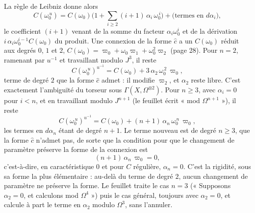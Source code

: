 \documentclass[11pt,a4paper]{article}
\begin{document}
La règle de Leibniz donne alors
\[
  C(\omega_0^{\,u}) = C(\omega_0)\Big( 1 + \sum_{i \geqslant 2}
  (i+1)\,\alpha_i\, \omega_0^{\,i} \Big) + \text{(termes en } d\alpha_i),
\]
le coefficient $(i+1)$ venant de la somme du facteur $\alpha_i\omega_0^i$ et
de la dérivation $i\,\alpha_i\omega_0^{i-1}C(\omega_0)$ du produit. Une
connexion de la forme $\widehat{c}$ a un $C(\omega_0)$ réduit aux degrés
$0$, $1$ et $2$, $C(\omega_0) = \varpi_0 + \omega_0\varpi_1 +
\omega_0^2\varpi_2$ (page 28). Pour $n = 2$, ramenant par $u^{-1}$ et
travaillant modulo $J^3$, il reste
\[
  C(\omega_0^{\,u})^{u^{-1}} = C(\omega_0)
  + 3\,\alpha_2\, \omega_0^{\,2}\, \varpi_0 ,
\]
terme de degré $2$ que la forme $\widehat{c}$ admet : il modifie $\varpi_2$,
et $\alpha_2$ reste libre. C'est exactement l'ambiguïté du torseur sous
$\Gamma(X, \Omega^{\otimes 2})$. Pour $n \geqslant 3$, avec $\alpha_i = 0$
pour $i < n$, et en travaillant modulo $J^{n+1}$ (le feuillet écrit
« mod $\Omega^{n+1}$ »), il reste
\[
  C(\omega_0^{\,u})^{u^{-1}} = C(\omega_0)
  + (n+1)\,\alpha_n\, \omega_0^{\,n}\, \varpi_0,
\]
les termes en $d\alpha_n$ étant de degré $n+1$. Le terme nouveau est de
degré $n \geqslant 3$, que la forme $\widehat{c}$ n'admet pas, de sorte que
la condition pour que le changement de paramètre préserve la forme de la
connexion est
\[
  (n+1)\,\alpha_n\,\varpi_0 = 0 ,
\]
c'est-à-dire, en caractéristique $0$ et pour $C$ régulière, $\alpha_n = 0$.
C'est la rigidité, sous sa forme la plus élémentaire : au-delà du terme de
degré $2$, aucun changement de paramètre ne préserve la forme. Le feuillet
traite le cas $n = 3$ (« Supposons $\alpha_2 = 0$, et calculons mod
$\Omega^4$ ») puis le cas général, toujours avec $\alpha_2 = 0$, et calcule
à part le terme en $\alpha_2$ modulo $\Omega^3$, sans l'annuler.
\end{document}
